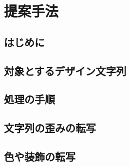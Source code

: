 \documentclass[\homedir/main.tex]{subfiles}
\begin{document}
\setcounter{chapter}{3}
\chapter{提案手法}\label{chap:methods}

\section{はじめに}

\section{対象とするデザイン文字列}

\section{処理の手順}

\section{文字列の歪みの転写}

\section{色や装飾の転写}

\printBibForSubfiles
\end{document}
